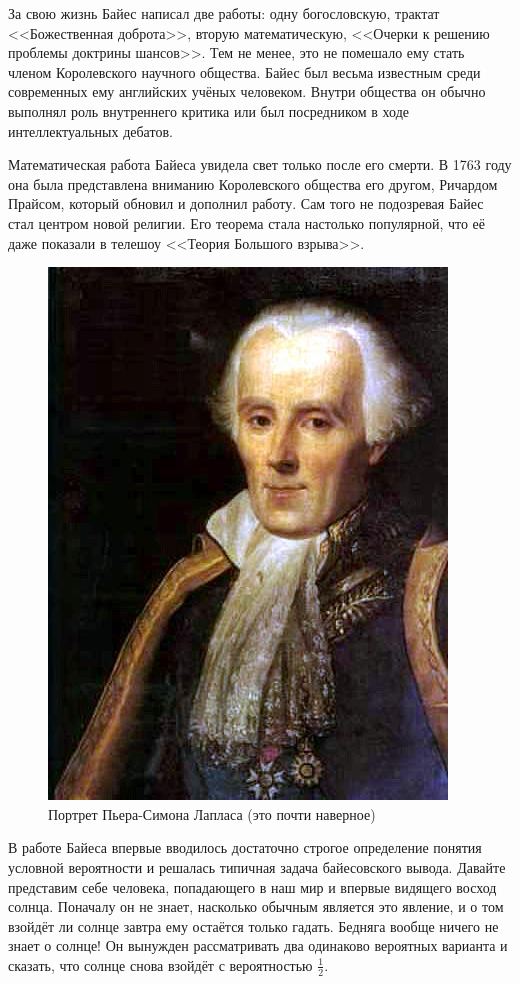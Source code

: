 \documentclass[12pt, a4paper, oneside]{extreport}
\theoremstyle{plain}              %
\theoremstyle{definition}         %
\begin{document}
За свою жизнь Байес написал две работы: одну богословскую, трактат <<Божественная доброта>>, вторую математическую, <<Очерки к решению проблемы доктрины шансов>>. Тем не менее, это не помешало ему стать членом Королевского научного общества. Байес был весьма известным среди современных ему английских учёных человеком. Внутри общества он обычно выполнял роль внутреннего критика или был посредником в ходе интеллектуальных дебатов.

Математическая работа Байеса увидела свет только после его смерти. В 1763 году она была представлена вниманию Королевского общества его другом, Ричардом Прайсом, который обновил и дополнил работу. Сам того не подозревая Байес стал центром новой религии. Его теорема стала настолько популярной, что её даже показали в телешоу <<Теория Большого взрыва>>.

\begin{figure}
	\centering \includegraphics[width=0.8\linewidth]{images/laplas.jpg}
	\caption{Портрет Пьера-Симона Лапласа (это почти наверное)}
\end{figure}

В работе Байеса впервые вводилось достаточно строгое определение понятия условной вероятности и решалась типичная задача байесовского вывода. Давайте представим себе человека, попадающего в наш мир и впервые видящего восход солнца. Поначалу он не знает, насколько обычным является это явление, и о том взойдёт ли солнце завтра ему остаётся только гадать. Бедняга вообще ничего не знает о солнце! Он вынужден рассматривать два одинаково вероятных варианта и сказать, что солнце снова взойдёт с вероятностью $\frac{1}{2}$.
\end{document}
